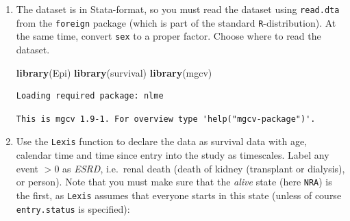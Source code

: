 \documentclass[
]{book}
\newenvironment{Shaded}{\begin{snugshade}}{\end{snugshade}}
\newcommand{\AttributeTok}[1]{\textcolor[rgb]{0.13,0.29,0.53}{#1}}
\newcommand{\CommentTok}[1]{\textcolor[rgb]{0.56,0.35,0.01}{\textit{#1}}}
\newcommand{\FunctionTok}[1]{\textcolor[rgb]{0.13,0.29,0.53}{\textbf{#1}}}
\newcommand{\NormalTok}[1]{#1}
\newcommand{\OtherTok}[1]{\textcolor[rgb]{0.56,0.35,0.01}{#1}}
\newcommand{\SpecialCharTok}[1]{\textcolor[rgb]{0.81,0.36,0.00}{\textbf{#1}}}
\newcommand{\StringTok}[1]{\textcolor[rgb]{0.31,0.60,0.02}{#1}}
\begin{document}
\begin{enumerate}
\def\labelenumi{\arabic{enumi}.}
\item
  The dataset is in Stata-format, so you must read the dataset
  using \texttt{read.dta} from the \texttt{foreign} package (which is
  part of the standard \texttt{R}-distribution). At the same time, convert
  \texttt{sex} to a proper factor. Choose where to read the dataset.

\begin{Shaded}
\begin{Highlighting}[]
\FunctionTok{library}\NormalTok{(Epi)}
\FunctionTok{library}\NormalTok{(survival)}
\FunctionTok{library}\NormalTok{(mgcv)}
\end{Highlighting}
\end{Shaded}

\begin{verbatim}
Loading required package: nlme
\end{verbatim}

\begin{verbatim}
This is mgcv 1.9-1. For overview type 'help("mgcv-package")'.
\end{verbatim}

\begin{Shaded}
\end{Shaded}
\item
  Use the \texttt{Lexis} function to declare the data as
  survival data with age, calendar time and time since entry into
  the study as timescales. Label any event \(>0\) as \emph{ESRD},
  i.e.~renal death (death of kidney (transplant or dialysis), or
  person).
  Note that you must make sure that the \emph{alive} state (here
  \texttt{NRA}) is the first, as \texttt{Lexis} assumes that
  everyone starts in this state (unless of course
  \texttt{entry.status} is specified):


\end{enumerate}
\end{document}
